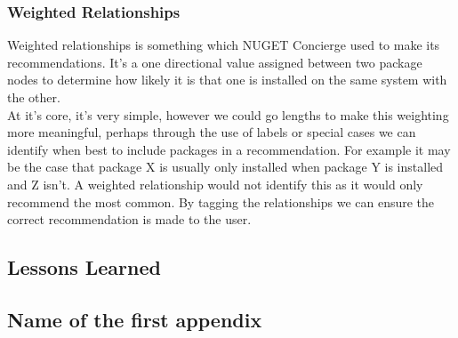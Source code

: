\documentclass{l4proj}
\begin{document}
\subsection{Weighted Relationships} 
Weighted relationships is something which NUGET Concierge used to make its recommendations. It's a one directional value assigned between two package nodes to determine how likely it is that one is installed on the same system with the other.\\
At it's core, it's very simple, however we could go lengths to make this weighting more meaningful, perhaps through the use of labels or special cases we can identify when best to include packages in a recommendation. For example it may be the case that package X is usually only installed when package Y is installed and Z isn't. A weighted relationship would not identify this as it would only recommend the most common. By tagging the relationships we can ensure the correct recommendation is made to the user.

\section{Lessons Learned}
 
\begin{appendices}
 
\chapter{Name of the first appendix}
 
\end{appendices}
 
 


\end{document}

